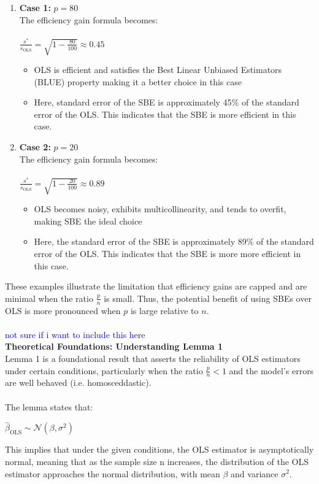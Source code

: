 \begin{enumerate}
    \item \textbf{Case 1:} $p = 80$\\
   The efficiency gain formula becomes:\\
    \\
    $\frac{s^*}{s_{\text{OLS}}} = \sqrt{1 - \frac{80}{100}} \approx 0.45$
    \begin{itemize}
        \item OLS is efficient and satisfies the Best Linear Unbiased Estimators (BLUE) property making it a better choice in this case
        \item Here, standard error of the SBE is approximately 45\% of the standard error of the OLS. This indicates that the SBE is more efficient in this case. 
    \end{itemize}

    
    \item \textbf{Case 2:} $p = 20$\\
    The efficiency gain formula becomes:\\
    \\
    $\frac{s^*}{s_{\text{OLS}}} = \sqrt{1 - \frac{20}{100}} \approx 0.89$\\
    \begin{itemize}
        \item OLS becomes noisy, exhibits multicollinearity, and tends to overfit, making SBE the ideal choice
        \item Here, the standard error of the SBE is approximately 89\% of the standard error of the OLS. This indicates that the SBE is more more efficient in this case. 
    \end{itemize}
   
\end{enumerate}

These examples illustrate the limitation that efficiency gains are capped and are minimal when the ratio $\frac{p}{n}$ is small. Thus, the potential benefit of using SBEs over OLS is more pronounced when $p$ is large relative to $n$.
\\
\\
\textcolor{blue}{not sure if i want to include this here}\\
\textbf{Theoretical Foundations: Understanding Lemma 1} \\
Lemma 1 is a foundational result that asserts the reliability of OLS estimators under certain conditions, particularly when the ratio $\frac{p}{n} < 1$ and the model's errors are well behaved (i.e. homosceddastic).\\
\\
The lemma states that: 
\begin{center}
    $\hat{\beta}_{\text{OLS}} \sim \mathcal{N}(\beta, \sigma^2)$    
\end{center}
This implies that under the given conditions, the OLS estimator is asymptotically normal, meaning that as the sample size n increases, the distribution of the OLS estimator approaches the normal distribution, with mean $\beta$ and variance $\sigma^2$.